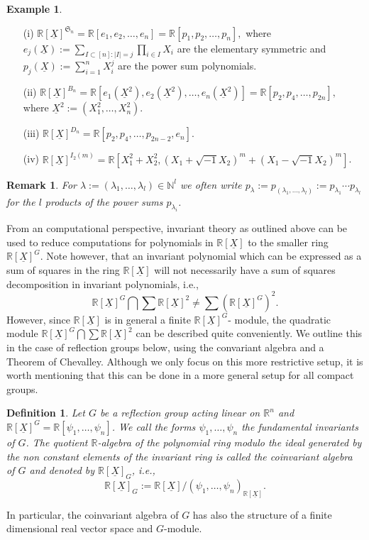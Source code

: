 \documentclass[11pt,a4paper]{amsart}
\numberwithin{equation}{section}
\newtheorem{definition}[thm]{Definition}
\newtheorem{remark}[thm]{Remark}
\theoremstyle{definition}
\newtheorem{example}[thm]{Example}
\newcommand{\N}{\mathbb{N}}
\newcommand{\R}{\mathbb{R}}
\numberwithin{thm}{section}
\theoremstyle{break}
\numberwithin{subcase}{case}
\begin{document}
\begin{example}
\begin{itemize}
    \item[(i)] $\R[\underline{X}]^{\mathfrak{S}_n} = \R[e_1,e_2,\ldots,e_n]=\R[p_1,p_2,\ldots,p_n],$ where \\
    $e_j (\underline{X}) := \sum_{I \subset [n] : |I|=j}\prod_{i \in I} X_i$ are the elementary symmetric and $p_j(\underline{X}):=\sum_{i=1}^nX_i^j$ are the power sum polynomials.
    \item[(ii)] $\R[\underline{X}]^{B_n}=\R[e_1(\underline{X}^2),e_2(\underline{X}^2),\ldots,e_n(\underline{X}^2)]=\R[p_2,p_4,\ldots,p_{2n}],$ where $\underline{X}^2:=(X_1^2,\ldots,X_n^2)$.
    \item[(iii)]  $
     \R[\underline{X}]^{D_n} = \R[p_2,p_4,\ldots,p_{2n-2},e_n]$. \item[(iv)] $\R[\underline{X}]^{I_2(m)} = \R[X_1^2+X_2^2,  (X_1+\sqrt{-1}X_2)^m+(X_1-\sqrt{-1}X_2)^m]$.
\end{itemize}
\end{example}
\begin{remark}
For $\lambda := (\lambda_1,\ldots,\lambda_l) \in \N^l$ we often write $p_{\lambda} := p_{(\lambda_1,\ldots,\lambda_l)} := p_{\lambda_1}\cdots p_{\lambda_l}$ for the $l$ products of the power sums $p_{\lambda_i}$.
\end{remark}
From an computational perspective, invariant theory as outlined above can be used to reduce computations for polynomials in $\R[\underline{X}]$ to the smaller ring $\R[\underline{X}]^G$. Note however, that an invariant polynomial which can be expressed as a sum of squares in the ring $\R[\underline{X}]$ will not necessarily have  a sum of squares decomposition in invariant polynomials, i.e., 
$$\R[\underline{X}]^G\bigcap\sum \R[\underline{X}]^2\neq \sum(\R[\underline{X}]^G)^2.$$
However, since $\R[\underline{X}]$ is in general a finite $\R[\underline{X}]^G$- module, the quadratic module $\R[\underline{X}]^G\bigcap\sum \R[\underline{X}]^2$ can be described quite conveniently. We outline this in the case of reflection groups below, using the convariant algebra and a Theorem of Chevalley. Although we only focus on this more restrictive setup, it is worth mentioning that this can be done in a more general setup for all compact groups. 
\begin{definition}
Let $G$ be a reflection group acting linear on $\R^n$ and $\R[\underline{X}]^G = \R[\psi_1,\ldots,\psi_n]$. We call the forms $\psi_1,\ldots,\psi_n$ the fundamental invariants of $G$. The quotient $\R$-algebra of the polynomial ring modulo the ideal generated by the non constant elements of the invariant ring is called the coinvariant algebra of $G$ and denoted by $\R[\underline{X}]_G$, i.e., $$\R[\underline{X}]_G := \R[\underline{X}] / \left(\psi_1,\ldots,\psi_n \right)_{\R[\underline{X}]}.$$
\end{definition}
In particular, the coinvariant algebra of $G$ has also the structure of a finite dimensional real vector space and $G$-module.
\end{document}
